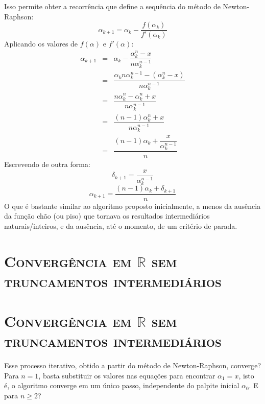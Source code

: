 \documentclass{article}
\let \sectionBkp = \section
\newcommand{\sectionFormatter}[1]{
    \centering\large\textbf{\textsc{#1}}}
\renewcommand{\section}[2]
    {\ifthenelse{\equal{#1}{*}}
        {\sectionBkp*{\sectionFormatter{#2}}}
        {\sectionBkp{\sectionFormatter{#2}}}
    }
\begin{document}
Isso permite obter a recorrência
que define a sequência do método de Newton-Raphson:
\[\alpha_{k+1} = \alpha_k - \dfrac{f(\alpha_k)}{f'(\alpha_k)}\]
Aplicando os valores de $f(\alpha)$ e $f'(\alpha)$:
\[
  \begin{array}{rcl}
  \alpha_{k+1}
  &=& \alpha_k - \dfrac{\alpha_k^n - x}{n \alpha_k^{n-1}} \\[5mm]
  &=& \dfrac{\alpha_k n \alpha_k^{n-1}
    - (\alpha_k^n - x)}{n \alpha_k^{n-1}} \\[5mm]
  &=& \dfrac{n \alpha_k^n - \alpha_k^n + x}{n \alpha_k^{n-1}} \\[5mm]
  &=& \dfrac{(n-1) \alpha_k^n + x}{n \alpha_k^{n-1}} \\[5mm]
  &=& \dfrac{(n-1) \alpha_k + \dfrac{x}{\alpha_k^{n-1}}}{n}
  \end{array}
\]
Escrevendo de outra forma:
\[\delta_{k+1} = \dfrac{x}{\alpha_k^{n-1}}\]
\[\alpha_{k+1} = \dfrac{(n-1) \alpha_k + \delta_{k+1}}{n}\]
O que é bastante similar ao algoritmo proposto inicialmente,
a menos da ausência da função chão (ou piso)
que tornava os resultados intermediários naturais/inteiros,
e da ausência, até o momento, de um critério de parada.


\section*{Convergência em $\mathds{R}$ sem truncamentos intermediários}

Esse processo iterativo,
obtido a partir do método de Newton-Raphson,
converge?
Para $n = 1$, basta substituir os valores nas equações
para encontrar $\alpha_1 = x$,
isto é, o algoritmo converge em um único passo,
independente do palpite inicial $\alpha_0$.
E para $n \ge 2$?
\end{document}
